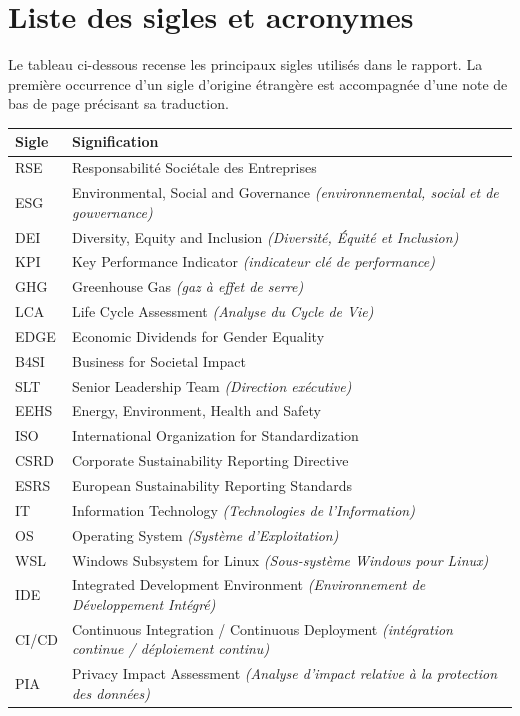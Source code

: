 \section*{Liste des sigles et acronymes}

Le tableau ci-dessous recense les principaux sigles utilisés dans le rapport. La première occurrence d'un sigle d'origine étrangère est accompagnée d'une note de bas de page précisant sa traduction.

\begin{table}[ht]
\centering
\renewcommand{\arraystretch}{1.2}
\begingroup
\renewcommand{\glos}[1]{#1}
\begin{tabularx}{\textwidth}{@{}lX@{}}
\toprule
\textbf{Sigle} & \textbf{Signification} \\
\midrule
\glos{RSE} & Responsabilité Sociétale des Entreprises \\
\glos{ESG} & Environmental, Social and Governance \textit{(environnemental, social et de gouvernance)} \\
\glos{DEI} & Diversity, Equity and Inclusion \textit{(Diversité, Équité et Inclusion)} \\
\glos{KPI} & Key Performance Indicator \textit{(indicateur clé de performance)} \\
\glos{GHG} & Greenhouse Gas \textit{(gaz à effet de serre)} \\
\glos{LCA} & Life Cycle Assessment \textit{(Analyse du Cycle de Vie)} \\
\glos{EDGE} & Economic Dividends for Gender Equality \\
\glos{B4SI} & Business for Societal Impact \\
\glos{SLT} & Senior Leadership Team \textit{(Direction exécutive)} \\
\glos{EEHS} & Energy, Environment, Health and Safety \\
\glos{ISO} & International Organization for Standardization \\
\glos{CSRD} & Corporate Sustainability Reporting Directive \\
\glos{ESRS} & European Sustainability Reporting Standards \\
\glos{IT} & Information Technology \textit{(Technologies de l'Information)} \\
\glos{OS} & Operating System \textit{(Système d'Exploitation)} \\
\glos{WSL} & Windows Subsystem for Linux \textit{(Sous-système Windows pour Linux)} \\
\glos{IDE} & Integrated Development Environment \textit{(Environnement de Développement Intégré)} \\
\glos{CI/CD} & Continuous Integration / Continuous Deployment \textit{(intégration continue / déploiement continu)} \\
\glos{PIA} & Privacy Impact Assessment \textit{(Analyse d'impact relative à la protection des données)} \\
\bottomrule
\end{tabularx}
\endgroup
\end{table}
